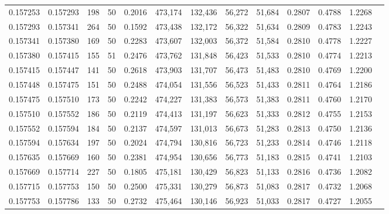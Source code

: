 \begin{tabular}{rrrrrrrrrrrrr}
0.157253 & 0.157293 &   198 &  50 &                                     0.2016 & 473,174 & 132,436 &  56,272 &  51,684 & 0.2807 & 0.4788 & 1.2268 \\
0.157293 & 0.157341 &   264 &  50 &                                     0.1592 & 473,438 & 132,172 &  56,322 &  51,634 & 0.2809 & 0.4783 & 1.2243 \\
0.157341 & 0.157380 &   169 &  50 &                                     0.2283 & 473,607 & 132,003 &  56,372 &  51,584 & 0.2810 & 0.4778 & 1.2227 \\
0.157380 & 0.157415 &   155 &  51 &                                     0.2476 & 473,762 & 131,848 &  56,423 &  51,533 & 0.2810 & 0.4774 & 1.2213 \\
0.157415 & 0.157447 &   141 &  50 &                                     0.2618 & 473,903 & 131,707 &  56,473 &  51,483 & 0.2810 & 0.4769 & 1.2200 \\
0.157448 & 0.157475 &   151 &  50 &                                     0.2488 & 474,054 & 131,556 &  56,523 &  51,433 & 0.2811 & 0.4764 & 1.2186 \\
0.157475 & 0.157510 &   173 &  50 &                                     0.2242 & 474,227 & 131,383 &  56,573 &  51,383 & 0.2811 & 0.4760 & 1.2170 \\
0.157510 & 0.157552 &   186 &  50 &                                     0.2119 & 474,413 & 131,197 &  56,623 &  51,333 & 0.2812 & 0.4755 & 1.2153 \\
0.157552 & 0.157594 &   184 &  50 &                                     0.2137 & 474,597 & 131,013 &  56,673 &  51,283 & 0.2813 & 0.4750 & 1.2136 \\
0.157594 & 0.157634 &   197 &  50 &                                     0.2024 & 474,794 & 130,816 &  56,723 &  51,233 & 0.2814 & 0.4746 & 1.2118 \\
0.157635 & 0.157669 &   160 &  50 &                                     0.2381 & 474,954 & 130,656 &  56,773 &  51,183 & 0.2815 & 0.4741 & 1.2103 \\
0.157669 & 0.157714 &   227 &  50 &                                     0.1805 & 475,181 & 130,429 &  56,823 &  51,133 & 0.2816 & 0.4736 & 1.2082 \\
0.157715 & 0.157753 &   150 &  50 &                                     0.2500 & 475,331 & 130,279 &  56,873 &  51,083 & 0.2817 & 0.4732 & 1.2068 \\
0.157753 & 0.157786 &   133 &  50 &                                     0.2732 & 475,464 & 130,146 &  56,923 &  51,033 & 0.2817 & 0.4727 & 1.2055 \\

\end{tabular}
